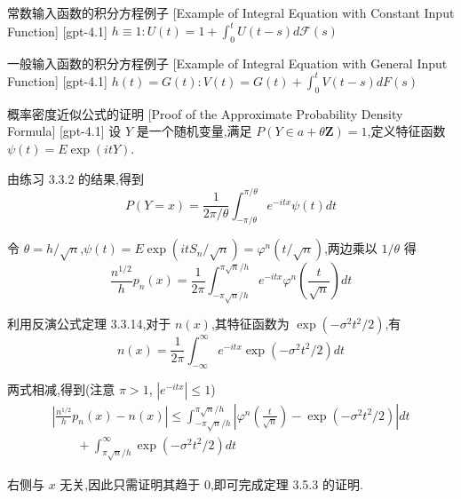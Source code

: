 \documentclass[UTF8]{ctexart}
\begin{document}
    \begin{xmp}
        {常数输入函数的积分方程例子}
        [Example of Integral Equation with Constant Input Function]
        [gpt-4.1]
        $h \equiv 1 \colon U(t) = 1 + \int_{0}^{t} U(t - s) d\mathcal{F}(s)$
    \end{xmp}
    
    
    
    \begin{xmp}
        {一般输入函数的积分方程例子}
        [Example of Integral Equation with General Input Function]
        [gpt-4.1]
        $h(t) = G(t) \colon V(t) = G(t) + \int_{0}^{t} V(t - s) dF(s)$
    \end{xmp}
    
    
    
    \begin{prf}
        {概率密度近似公式的证明}
        [Proof of the Approximate Probability Density Formula]
        [gpt-4.1]
        设 $Y$ 是一个随机变量,满足 $P ( Y \in a + \theta \mathbf { Z } ) = 1$,定义特征函数 $\psi ( t ) = E \exp ( i t Y )$.

由练习 3.3.2 的结果,得到
\[
P ( Y = x ) = \frac{ 1 }{ 2 \pi / \theta } \int_{ - \pi / \theta }^{ \pi / \theta } e^{ - i t x } \psi ( t ) d t
\]

令 $\theta = h / \sqrt{ n }$,$\psi ( t ) = E \exp ( i t S_n / \sqrt{ n } ) = \varphi^n ( t / \sqrt{ n } )$,两边乘以 $1 / \theta$ 得
\[
\frac{ n^{1/2} }{ h } p_n(x) = \frac{ 1 }{ 2 \pi } \int_{ - \pi \sqrt{ n } / h }^{ \pi \sqrt{ n } / h } e^{ - i t x } \varphi^n \left( \frac{ t }{ \sqrt{ n } } \right) d t
\]

利用反演公式定理 3.3.14,对于 $n(x)$,其特征函数为 $\exp ( - \sigma^2 t^2 / 2 )$,有
\[
n(x) = \frac{ 1 }{ 2 \pi } \int_{ -\infty }^{ \infty } e^{ - i t x } \exp ( - \sigma^2 t^2 / 2 ) d t
\]

两式相减,得到(注意 $\pi > 1$, $|e^{ - i t x }| \leq 1$)
\[
\begin{array}{l}
\displaystyle \left| \frac{ n^{1/2} }{ h } p_n(x) - n(x) \right| \le \int_{ - \pi \sqrt{ n } / h }^{ \pi \sqrt{ n } / h } \left| \varphi^n \left( \frac{ t }{ \sqrt{ n } } \right) - \exp ( - \sigma^2 t^2 / 2 ) \right| d t \\
\displaystyle \qquad + \int_{ \pi \sqrt{ n } / h }^{ \infty } \exp ( - \sigma^2 t^2 / 2 ) d t
\end{array}
\]

右侧与 $x$ 无关,因此只需证明其趋于 0,即可完成定理 3.5.3 的证明.

    \end{prf}
    
\end{document}
